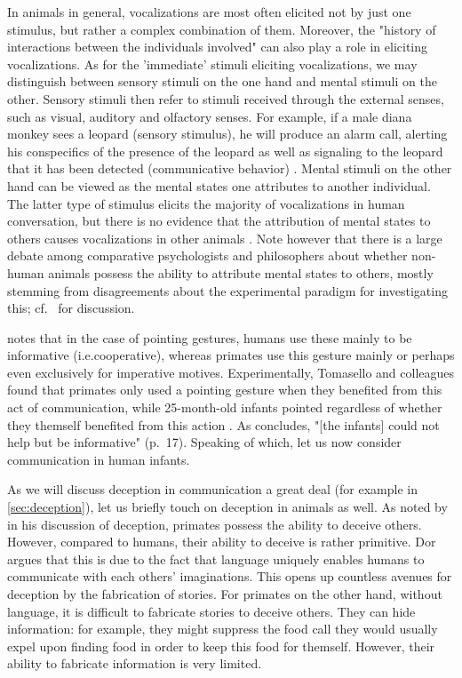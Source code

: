 In animals in general, vocalizations are most often elicited not by just one stimulus, but rather a complex combination of them. Moreover, the "history of interactions between the individuals involved" \citep[p.~151]{SeyfarthCheney03} can also play a role in eliciting vocalizations. As for the 'immediate' stimuli eliciting vocalizations, we may distinguish between sensory stimuli on the one hand and mental stimuli on the other. Sensory stimuli then refer to stimuli received through the external senses, such as visual, auditory and olfactory senses.
For example, if a male diana monkey sees a leopard (sensory stimulus), he will produce an alarm call, alerting his conspecifics of the presence of the leopard as well as signaling to the leopard that it has been detected (communicative behavior) \citep{Zuberbuhler97}.
Mental stimuli on the other hand can be viewed as the mental states one attributes to another individual.
The latter type of stimulus elicits the majority of vocalizations in human conversation, but there is no evidence that the attribution of mental states to others causes vocalizations in other animals \citep{SeyfarthCheney03}. Note however that there is a large debate among comparative psychologists and philosophers about whether non-human animals possess the ability to attribute mental states to others, mostly stemming from disagreements about the experimental paradigm for investigating this; cf.~\citet[Chapter~6]{Andrews15} for discussion.

\citet{Tomasello09} notes that in the case of pointing gestures, humans use these mainly to be informative (i.e.\@ cooperative), whereas primates use this gesture mainly or perhaps even exclusively for imperative motives. Experimentally, Tomasello and colleagues found that primates only used a pointing gesture when they benefited from this act of communication, while 25-month-old infants pointed regardless of whether they themself benefited from this action \citep{Bullinger11}. As \citet{Tomasello09} concludes, "[the infants] could not help but be informative" (p.~17). Speaking of which, let us now consider communication in human infants.

As we will discuss deception in communication a great deal (for example in \cref{sec:deception}), let us briefly touch on deception in animals as well. As noted by \citet{Dor17} in his discussion of deception, primates possess the ability to deceive others.
However, compared to humans, their ability to deceive is rather primitive. Dor argues that this is due to the fact that language uniquely enables humans to communicate with each others' imaginations. This opens up countless avenues for deception by the fabrication of stories. For primates on the other hand, without language, it is difficult to fabricate stories to deceive others. They can hide information: for example, they might suppress the food call they would usually expel upon finding food in order to keep this food for themself. However, their ability to fabricate information is very limited.


